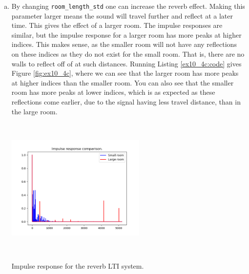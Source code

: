 \begin{enumerate}
\begin{enumerate}[a)]
          \item By changing \verb|room_length_std| one can increase the reverb effect.
                Making this parameter larger means the sound will travel further and reflect at a later time.
                This gives the effect of a larger room. The impulse responses are similar,
                but the impulse response for a larger room has more peaks at higher indices. This makes
                sense, as the smaller room will not have any reflections on these indices as they do not exist
                for the small room. That is, there are no walls to reflect off of at such distances.
                Running Listing \ref{ex10_4c:code} gives Figure \ref{fig:ex10_4c}, where we can see that
                the larger room has more peaks at higher indices than the smaller room. You can also
                see that the smaller room has more peaks at lower indices, which is as expected as these
                reflections come earlier, due to the signal having less travel distance, than in the large room.

                \begin{marginfigure}
                  \includegraphics[width=6.9cm, height=7.0cm]{ch10/figures/ex10_4c.png}
                  \caption{Impulse response for the reverb LTI system.}
                  \label{fig:ex10_4c}
                \end{marginfigure}

                


\end{enumerate}
\end{enumerate}
